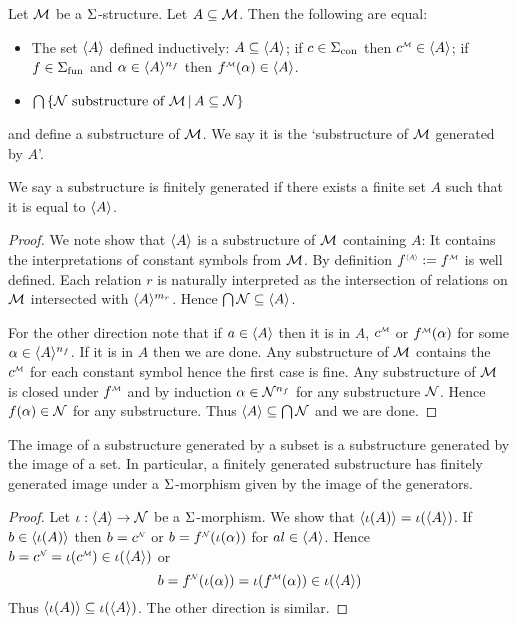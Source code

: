 \begin{dfn}
    Let $\mathcal{M}$ be a $\Sigma$-structure.
    Let $A \subseteq \mathcal{M}$.
    Then the following are equal:
    \begin{itemize}
        \item The set $\langle A\rangle$ defined inductively: $A\subseteq \langle A\rangle$;
        if $c \in {\Sigma}_\mathrm{con}$ then 
        $\mmintp{c} \in \<A\>$; if $f \in {\Sigma}_\mathrm{fun}$ and 
        $\alpha \in \langle A\rangle^{n_f}$ then $\mmintp{f}(\al) \in \<A\>$.
        \item $\bigcap \left\{\mathcal{N} \text{ substructure of } \mathcal{M} \,|\, A \subseteq \mathcal{N}\right\}$
    \end{itemize}
    and define a substructure of $\mathcal{M}$.
    We say it is the `substructure of $\mathcal{M}$ generated by $A$'.
    
    We say a substructure is finitely generated if there exists a finite set 
    $A$ such that it is equal to $\langle A\rangle$.
\end{dfn}
\begin{proof}
    We note show that $\langle A\rangle$ is a substructure of $\mathcal{M}$ containing $A$:
    It contains the interpretations of constant symbols from $\mathcal{M}$.
    By definition $\modintp{\<A\>}{f} := \mmintp{f}$ is well defined.
    Each relation $r$ is naturally interpreted as the intersection of relations
    on $\mathcal{M}$ intersected with $\langle A\rangle^{m_r}$.
    Hence $\bigcap \mathcal{N} \subseteq \langle A\rangle$.

    For the other direction note that if $a \in \langle A\rangle$ then it is in $A$,
    $\mmintp{c}$
    or $\mmintp{f}(\al)$ for some $\alpha \in \langle A\rangle^{n_f}$.
    If it is in $A$ then we are done.
    Any substructure of $\mathcal{M}$ contains the $\mmintp{c}$ for each constant symbol
    hence the first case is fine.
    Any substructure of $\mathcal{M}$ is closed under $\mmintp{f}$ and by induction
    $\alpha \in \mathcal{N}^{n_f}$ for any substructure $\mathcal{N}$.
    Hence $f(\alpha) \in \mathcal{N}$ for any substructure.
    Thus $\langle A\rangle \subseteq \bigcap \mathcal{N}$ and we are done.
\end{proof}

\begin{prop}
    The image of a substructure generated by a subset is a substructure 
    generated by the image of a set.
    In particular,
    a finitely generated substructure has finitely generated image under a 
    $\Sigma$-morphism given by the image of the generators.
\end{prop}
\begin{proof}
    Let $\iota : \langle A\rangle \to \mathcal{N}$ be a $\Sigma$-morphism.
    We show that $\langle\iota(A)\rangle = \iota(\langle A\rangle)$.
    If $b \in \langle\iota(A)\rangle$ then $b = \nnintp{c}$ or $b = \nnintp{f}(\io(\al))$ 
    for $al \in \langle A\rangle$.
    Hence $b = \nnintp{c} = \io(\mmintp{c}) \in \io(\<A\>)$
    or 
    \[b = \nnintp{f}(\io(\al)) = \io(\mmintp{f}(\al)) \in \io(\<A\>)\]
    Thus $\langle\iota(A)\rangle \subseteq \iota(\langle A\rangle)$.
    The other direction is similar.
\end{proof}

